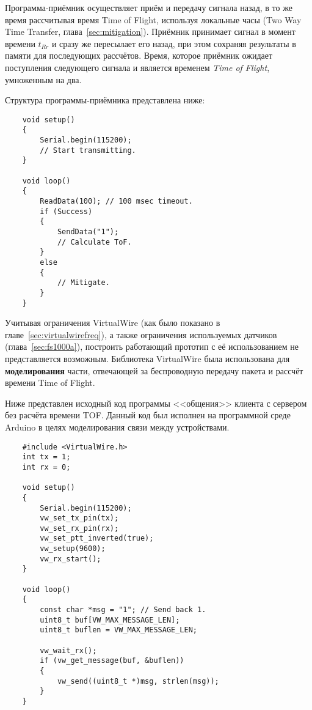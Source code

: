 Программа-приёмник осуществляет приём и передачу сигнала назад, в то же время рассчитывая время Time of Flight, используя локальные часы (Two Way Time Transfer, глава~\ref{sec:mitigation}). Приёмник принимает сигнал в момент времени $t_{Rr}$ и сразу же пересылает его назад, при этом сохраняя результаты в памяти для последующих рассчётов. Время, которое приёмник ожидает поступления следующего сигнала и является временем \textit{Time of Flight}, умноженным на два.

Структура программы-приёмника представлена ниже:

\begin{verbatim}
    void setup()
    {
        Serial.begin(115200);
        // Start transmitting.
    }

    void loop()
    {
        ReadData(100); // 100 msec timeout.
        if (Success)
        {
            SendData("1");
            // Calculate ToF.
        }
        else
        {
            // Mitigate.
        }
    }
\end{verbatim}

Учитывая ограничения VirtualWire (как было показано в главе~\ref{sec:virtualwirefreq}), а также ограничения используемых датчиков (глава~\ref{sec:fs1000a}), построить работающий прототип с её использованием не представляется возможным. Библиотека VirtualWire была использована для \textbf{моделирования} части, отвечающей за беспроводную передачу пакета и рассчёт времени Time of Flight.

Ниже представлен исходный код программы <<общения>> клиента с сервером без расчёта времени TOF. Данный код был исполнен на программной среде Arduino в целях моделирования связи между устройствами.

\begin{verbatim}
    #include <VirtualWire.h>
    int tx = 1;
    int rx = 0;

    void setup()
    {
        Serial.begin(115200);
        vw_set_tx_pin(tx);
        vw_set_rx_pin(rx);
        vw_set_ptt_inverted(true);
        vw_setup(9600);
        vw_rx_start();
    }

    void loop()
    {
        const char *msg = "1"; // Send back 1.
        uint8_t buf[VW_MAX_MESSAGE_LEN];
        uint8_t buflen = VW_MAX_MESSAGE_LEN;

        vw_wait_rx();
        if (vw_get_message(buf, &buflen))
        {
            vw_send((uint8_t *)msg, strlen(msg));
        }
    }
\end{verbatim}

